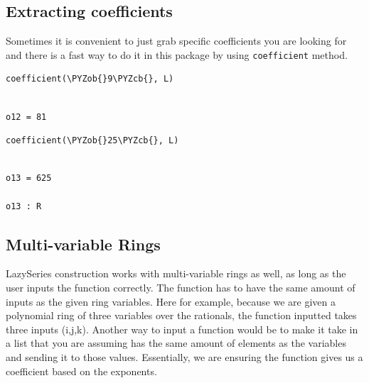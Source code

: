 \documentclass[11pt]{article}
\makeatletter
\def\PYZob{\char`\{}
\def\PYZcb{\char`\}}
\newcommand{\boxspacing}{\kern\kvtcb@left@rule\kern\kvtcb@boxsep}
\newcommand{\prompt}[4]{
        {\ttfamily\llap{{\color{#2}[#3]:\hspace{3pt}#4}}\vspace{-\baselineskip}}
    }
\makeatother
\begin{document}
    \hypertarget{extracting-coefficients}{%
\subsection{Extracting coefficients}\label{extracting-coefficients}}

Sometimes it is convenient to just grab specific coefficients you are
looking for and there is a fast way to do it in this package by using
\texttt{coefficient} method.

    \begin{tcolorbox}[breakable, size=fbox, boxrule=1pt, pad at break*=1mm,colback=cellbackground, colframe=cellborder]
\prompt{In}{incolor}{12}{\boxspacing}
\begin{Verbatim}[commandchars=\\\{\}]
coefficient(\PYZob{}9\PYZcb{}, L)
\end{Verbatim}
\end{tcolorbox}

    \begin{Verbatim}[commandchars=\\\{\}]

o12 = 81
    \end{Verbatim}

    \begin{tcolorbox}[breakable, size=fbox, boxrule=1pt, pad at break*=1mm,colback=cellbackground, colframe=cellborder]
\prompt{In}{incolor}{13}{\boxspacing}
\begin{Verbatim}[commandchars=\\\{\}]
coefficient(\PYZob{}25\PYZcb{}, L)
\end{Verbatim}
\end{tcolorbox}

    \begin{Verbatim}[commandchars=\\\{\}]

o13 = 625

o13 : R
    \end{Verbatim}

    \hypertarget{multi-variable-rings}{%
\subsection{Multi-variable Rings}\label{multi-variable-rings}}

LazySeries construction works with multi-variable rings as well, as long
as the user inputs the function correctly. The function has to have the
same amount of inputs as the given ring variables. Here for example,
because we are given a polynomial ring of three variables over the
rationals, the function inputted takes three inputs (i,j,k). Another way
to input a function would be to make it take in a list that you are
assuming has the same amount of elements as the variables and sending it
to those values. Essentially, we are ensuring the function gives us a
coefficient based on the exponents.
\end{document}
